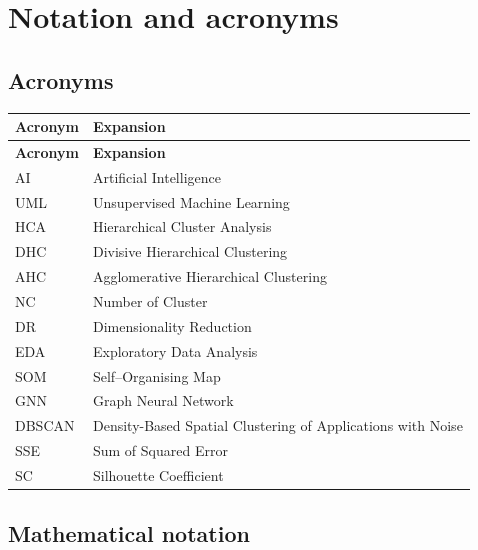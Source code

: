 \section*{Notation and acronyms}

\subsection*{Acronyms}

\begin{longtable}{@{}l P{12cm}@{}}
  \toprule
  \textbf{Acronym} & \textbf{Expansion} \\
  \midrule
  \endfirsthead
  \toprule
  \textbf{Acronym} & \textbf{Expansion} \\
  \midrule
  \endhead
  \bottomrule
  \endlastfoot
  AI & Artificial Intelligence \\
  UML & Unsupervised Machine Learning \\
  HCA & Hierarchical Cluster Analysis \\
  DHC & Divisive Hierarchical Clustering \\
  AHC & Agglomerative Hierarchical Clustering \\
  NC & Number of Cluster \\
  DR & Dimensionality Reduction \\
  EDA & Exploratory Data Analysis \\
  SOM & Self–Organising Map \\
  GNN & Graph Neural Network \\
  DBSCAN & Density-Based Spatial Clustering of Applications with Noise \\
  SSE & Sum of Squared Error \\
  SC & Silhouette Coefficient \\
\end{longtable}
\addtocounter{table}{-1}  %

\subsection*{Mathematical notation}


